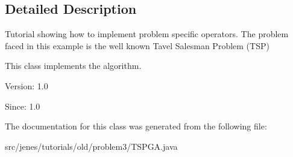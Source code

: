 \subsection{Detailed Description}
Tutorial showing how to implement problem specific operators. The problem faced in this example is the well known Tavel Salesman Problem (TSP)

This class implements the algorithm.

\begin{Desc}
\item[Version:]1.0 \end{Desc}
\begin{Desc}
\item[Since:]1.0 \end{Desc}


The documentation for this class was generated from the following file:\begin{CompactItemize}
\item 
src/jenes/tutorials/old/problem3/TSPGA.java\end{CompactItemize}
